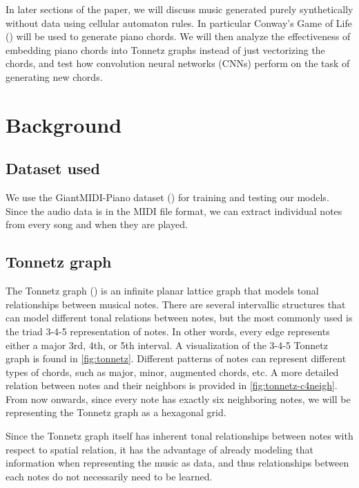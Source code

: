 \documentclass[
	a4paper, %
	10pt, %
	unnumberedsections, %
	twoside, %
]{LTJournalArticle}
\begin{document}
In later sections of the paper, we will discuss music generated purely synthetically without data using cellular automaton rules. In particular Conway's Game of Life (\textcite{bays_introduction_2010}) will be used to generate piano chords. We will then analyze the effectiveness of embedding piano chords into Tonnetz graphs instead of just vectorizing the chords, and test how convolution neural networks (CNNs) perform on the task of generating new chords.

\section{Background}

\subsection{Dataset used}

We use the GiantMIDI-Piano dataset (\textcite{kong_giantmidi-piano_2022}) for training and testing our models. Since the audio data is in the MIDI file format, we can extract individual notes from every song and when they are played.

\subsection{Tonnetz graph}

The Tonnetz graph (\textcite{tymoczko_generalized_2012}) is an infinite planar lattice graph that models tonal relationships between musical notes. There are several intervallic structures that can model different tonal relations between notes, but the most commonly used is the triad 3-4-5 representation of notes. In other words, every edge represents either a major 3rd, 4th, or 5th interval. A visualization of the 3-4-5 Tonnetz graph is found in \autoref{fig:tonnetz}. Different patterns of notes can represent different types of chords, such as major, minor, augmented chords, etc. A more detailed relation between notes and their neighbors is provided in \autoref{fig:tonnetz-c4neigh}. From now onwards, since every note has exactly six neighboring notes, we will be representing the Tonnetz graph as a hexagonal grid.

Since the Tonnetz graph itself has inherent tonal relationships between notes with respect to spatial relation, it has the advantage of already modeling that information when representing the music as data, and thus relationships between each notes do not necessarily need to be learned.
\end{document}
